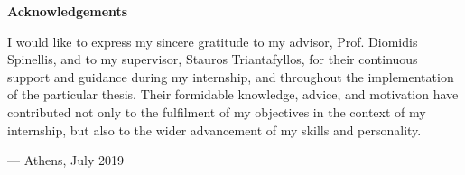 \begin{center}
\textbf{\large Acknowledgements}
\end{center}

I would like to express my sincere gratitude
to my advisor, Prof. Diomidis Spinellis,
and to my supervisor, Stauros Triantafyllos,
for their continuous support and guidance
during my internship,
and throughout the implementation
of the particular thesis.
Their formidable knowledge, advice, and motivation
have contributed not only to the fulfilment
of my objectives in the context of my internship,
but also to the wider advancement of my skills and personality.

\vspace{1cm}

\hfill --- Athens, July 2019
